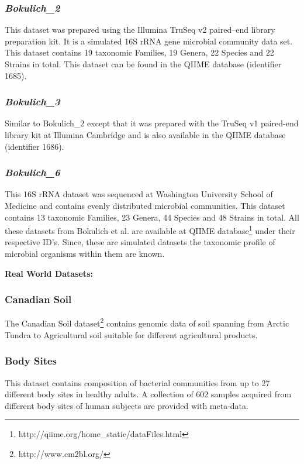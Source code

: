 \documentclass[10pt, conference, compsocconf]{IEEEtran}
\begin{document}
\subsubsection{\textit{Bokulich\_2}}
This dataset was prepared using the 
Illumina TruSeq v2 paired--end library
preparation kit. It is a simulated 16S rRNA gene 
microbial community data set.
This 
dataset contains 19 taxonomic Families, 19 Genera, 22 Species 
and 22 Strains in total. This dataset can be 
found in the QIIME database (identifier 1685).

\subsubsection{\textit{Bokulich\_3}}
Similar to Bokulich\_2 except that it was 
prepared with the 
TruSeq v1 paired-end library kit at 
Illumina Cambridge and is  also available in the 
QIIME database (identifier 1686).

\subsubsection{\textit{Bokulich\_6}}
This  16S rRNA dataset 
was sequenced at Washington University School of Medicine and 
contains evenly distributed microbial communities. This 
dataset contains 13 taxonomic 
Families, 23 Genera, 44 Species and 48 Strains in total.
%
All these datasets from Bokulich et al.\cite{MARmockDatasetRef} are 
available at QIIME database\footnote{http://qiime.org/home\_static/dataFiles.html} under their respective ID's. Since, these are simulated 
datasets the taxonomic profile of microbial organisms within them 
are known.

\textbf{Real World Datasets:}

\subsubsection{Canadian Soil}
The Canadian Soil dataset\footnote{http://www.cm2bl.org/} contains 
genomic data of soil spanning from Arctic 
Tundra to Agricultural soil suitable for different 
agricultural products.  %

\subsubsection{Body Sites}
This dataset contains composition of 
bacterial communities from up to 27 different 
body sites in healthy adults. A collection of 602 samples acquired from different body sites of human subjects are provided with meta-data.
\end{document}
